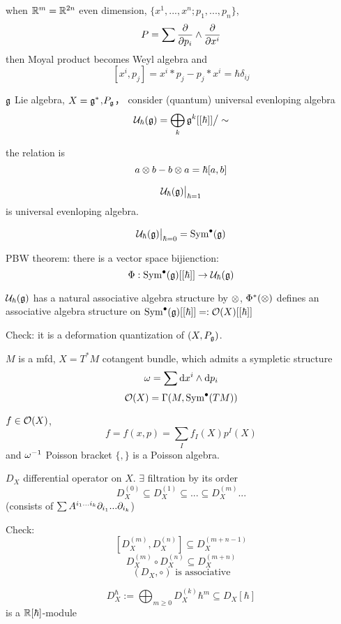 

\begin{example}
when $\mathbb{R}^m=\mathbb{R}^{2n}$ even dimension, $\{x^1,...,x^n;p_1,...,p_n\}$,
$$P=\sum\frac{\partial } {\partial p_i}\wedge\frac{\partial } {\partial x^i}$$
then Moyal product becomes Weyl algebra and
$$[x^i,p_j]=x^i*p_j-p_j*x^i=\hbar\delta_{ij}$$
\end{example}

\begin{example}
$\mathfrak{g}$ Lie algebra, $X=\mathfrak{g}^*$,$P_{\mathfrak{g}}$，
consider (quantum) universal evenloping algebra
$$\mathcal{U}_{\hbar}(\mathfrak{g})=\bigoplus_{k}\mathfrak{g}^{k}[[\hbar]]\big/\sim$$ 

the relation is 
$$a\otimes b-b\otimes a=\hbar[a,b]$$

$$\mathcal{U}_{\hbar}(\mathfrak{g})\big|_{\hbar=1}$$
is universal evenloping algebra.

$$\mathcal{U}_{\hbar}(\mathfrak{g})\big|_{\hbar=0}=\operatorname{Sym}^{\bullet}(\mathfrak{g})$$

\end{example}

PBW theorem:
there is a vector space bijienction:
$$\Phi:\operatorname{Sym}^{\bullet}(\mathfrak{g})[[\hbar]]\to\mathcal{U}_{\hbar}(\mathfrak{g})$$

$\mathcal{U}_{\hbar}(\mathfrak{g})$ has a natural associative algebra 
structure by $\otimes$, $\Phi^{*}(\otimes)$ defines an associative algebra structure on 
$\operatorname{Sym}^{\bullet}(\mathfrak{g})[[\hbar]]=:\mathcal{O}(X)[[\hbar]]$

Check: it is a deformation quantization of $(X,P_{\mathfrak{g}})$.

\begin{example}
$M$ is a mfd, $X=T^*M$ cotangent bundle, which admits a sympletic structure
$$\omega=\sum\mathrm{d} x^i\wedge\mathrm{d} p_i$$
$$\mathcal{O}(X)=\Gamma(M,\operatorname{Sym}^{\bullet}(TM))$$ 
\end{example}

$f\in\mathcal{O}(X)$,
$$f=f(x,p)=\sum_{I}f_I(X)p^{I}(X)$$
and $\omega^{-1}$ Poisson bracket $\{,\}$ is a Poisson algebra.

$D_X$ differential operator on $X$.
$\exists$ filtration by its order 
$$D_X^{(0)}\subseteq D_X^{(1)}\subseteq...\subseteq D_X^{(m)}...$$
(consists of $\sum A^{i_1...i_k}\partial_{i_1}...\partial_{i_k}$)

Check:
$$[D_X^{(m)},D_X^{(n)}]\subseteq D_X^{(m+n-1)}$$
$$D_X^{(m)}\circ D_X^{(n)}\subseteq D_X^{(m+n)}$$
$$(D_X,\circ)\text{ is associative}$$


\begin{definition}
$$D_X^{\hbar}:=\bigoplus_{m\geq 0}D^{(k)}_X\hbar^m\subseteq D_X[\hbar]$$
is a $\mathbb{R}[\hbar]$-module
\end{definition}

